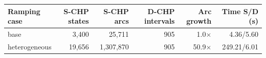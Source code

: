 \begin{tabular}{lrrrrr}
\toprule
Ramping case & S-CHP states & S-CHP arcs & D-CHP intervals & Arc growth & Time S/D (s) \\
\midrule
base & 3,400 & 25,711 & 905 & 1.0$\times$ & 4.36/5.60 \\
heterogeneous & 19,656 & 1,307,870 & 905 & 50.9$\times$ & 249.21/6.01 \\
\bottomrule
\end{tabular}
